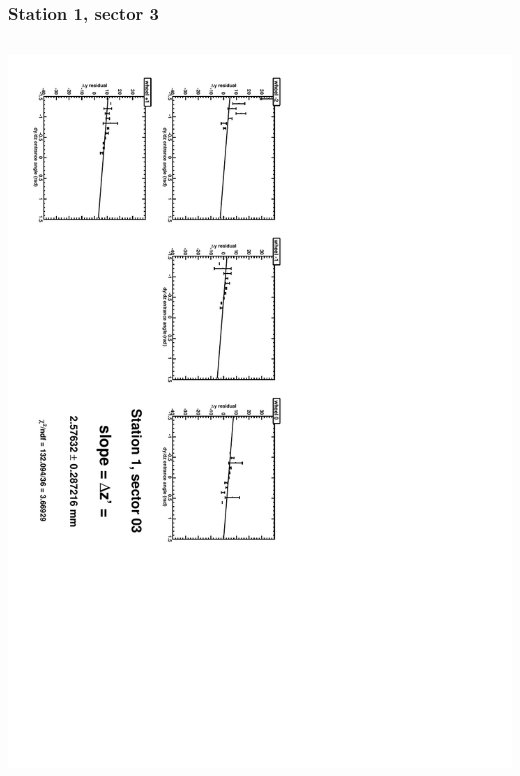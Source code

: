 \documentclass[compress]{beamer}
\begin{document}
\begin{frame}
\frametitle{Station 1, sector 3}
\begin{columns}
\includegraphics[height=\linewidth, angle=90]{zfits/zfit_1_03.pdf}


\end{columns}
\end{frame}
\end{document}
